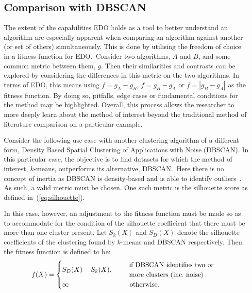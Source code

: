 \subsection{Comparison with DBSCAN}\label{subsec:dbscan}

The extent of the capabilities EDO holds as a tool to better understand an
algorithm are especially apparent when comparing an algorithm against another
(or set of others) simultaneously. This is done by utilising the freedom of
choice in a fitness function for EDO.\ Consider two algorithms, \(A\) and \(B\),
and some common metric between them, \(g\). Then their similarities and
contrasts can be explored by considering the differences in this metric on the
two algorithms. In terms of EDO, this means using \(f = g_A - g_B\), \(f = g_B -
g_A\) or \(f = \left| g_B - g_A \right|\) as the fitness function. By doing so,
pitfalls, edge cases or fundamental conditions for the method may be
highlighted. Overall, this process allows the researcher to more deeply learn
about the method of interest beyond the traditional method of literature
comparison on a particular example.

Consider the following use case with another clustering algorithm of a different
form, Density Based Spatial Clustering of Applications with Noise (DBSCAN). In
this particular case, the objective is to find datasets for which the method of
interest, \(k\)-means, outperforms its alternative, DBSCAN.\ Here there is no
concept of inertia as DBSCAN is density-based and is able to identify
outliers~\cite{Ester1996}. As such, a valid metric must be chosen. One such
metric is the silhouette score as defined in~(\ref{eq:silhouette}).

In this case, however, an adjustment to the fitness function must be made so as
to accommodate for the condition of the silhouette coefficient that there must
be more than one cluster present. Let \(S_k (X)\) and \(S_D (X)\) denote the
silhouette coefficients of the clustering found by \(k\)-means and DBSCAN
respectively. Then the fitness function is defined to be:
\begin{equation}
    f(X) =
        \begin{cases}
            S_D (X) - S_k (X), &\quad \text{%
                \begin{tabular}{l}%
                    if DBSCAN identifies two or
                    \\
                    more clusters (inc.\ noise)
                \end{tabular}
            }\\
            \infty &\quad \ \ \text{otherwise.}
        \end{cases}\label{eq:dbscan-fitness}
\end{equation}


